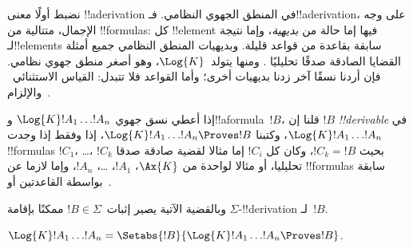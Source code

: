 \documentclass[../../../include/open-logic-section]{subfiles}
\begin{document}


نضبط أولًا معنى !!a{derivation} في المنطق الجهوي النظامي.
فـ!!a{derivation}، على وجه الإجمال، متتالية من !!{formula}s:
كل !!{element} فيها إما حالة من \emph{بديهية}، وإما نتيجة
لـ!!{element}s سابقة بقاعدة من قواعد قليلة.
وبديهيات المنطق النظامي جميع أمثلة القضايا الصادقة صدقًا تحليليًا
.
ومنها يتولد~$\Log{K}$، وهو أصغر منطق جهوي نظامي. فإن أردنا
نسقًا آخر زدنا بديهيات أخرى؛ وأما القواعد فلا تتبدل:
القياس الاستثنائي~\MP{} والإلزام~\Nec.

\begin{defn}
  إذا أعطي نسق جهوي $\Log{K} !A_1 \dots !A_n$ و!!a{formula}~$!B$،
  قلنا إن $!B$ \emph{!!{derivable}} في $\Log{K} !A_1 \dots
  !A_n$، وكتبنا $\Log{K} !A_1 \dots !A_n \Proves !B$، إذا وفقط إذا
  وجدت !!{formula}s $!C_1$، \dots، $!C_k$ بحيث $!C_k = !B$، وكان كل
  $!C_i$ إما مثالا لقضية صادقة صدقا تحليليا، أو مثالا لواحدة من
  $\Ax{K}$، $!A_1$، \dots، $!A_n$،
  وإما لازما عن !!{formula}s سابقة بواسطة القاعدتين \MP{} أو~\Nec.
\end{defn}

وبالقضية الآتية يصير إثبات~$!B \in \Sigma$ ممكنًا بإقامة
$\Sigma$-!!{derivation} لـ~$!B$.

\begin{prop}
  $\Log{K} !A_1 \dots !A_n = \Setabs{!B}{\Log{K} !A_1 \dots !A_n \Proves !B}$.
\end{prop}
\end{document}
